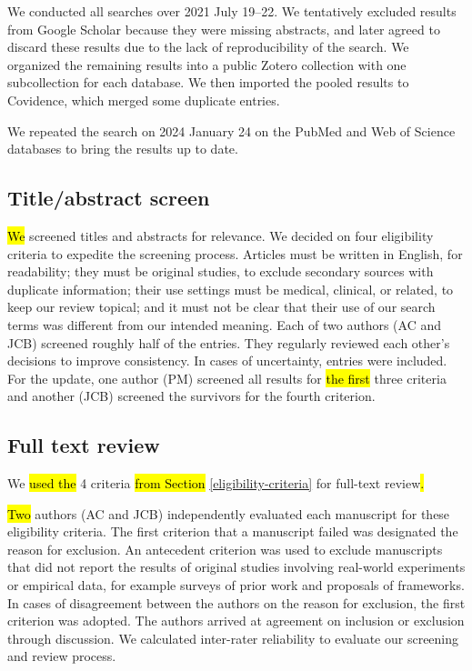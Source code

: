 \documentclass[sn-mathphys,Numbered,pdflatex]{sn-jnl}
\theoremstyle{remark}
\theoremstyle{definition}
\begin{document}
We conducted all searches over 2021 July 19--22. We tentatively excluded
results from Google Scholar because they were missing abstracts, and
later agreed to discard these results due to the lack of reproducibility
of the search. We organized the remaining results into a public Zotero
collection with one subcollection for each database. We then imported
the pooled results to Covidence, which merged some duplicate entries.

We repeated the search on 2024 January 24 on the PubMed and Web of
Science databases to bring the results up to date.

\subsection{Title/abstract screen}\label{titleabstract-screen}

\hl{We} screened titles and abstracts for relevance. We decided on four
eligibility criteria to expedite the screening process. Articles must be
written in English, for readability; they must be original studies, to
exclude secondary sources with duplicate information; their use settings
must be medical, clinical, or related, to keep our review topical; and
it must not be clear that their use of our search terms was different
from our intended meaning. Each of two authors (AC and JCB) screened
roughly half of the entries. They regularly reviewed each other's
decisions to improve consistency. In cases of uncertainty, entries were
included. For the update, one author (PM) screened all results for
\hl{the first }three criteria and another (JCB) screened the survivors
for the fourth criterion.

\subsection{Full text review}\label{full-text-review}

We \hl{used the} 4 criteria\hl{ from Section }\ref{eligibility-criteria}
for full-text review\hl{.}

\hl{Two} authors (AC and JCB) independently evaluated each manuscript
for these eligibility criteria. The first criterion that a manuscript
failed was designated the reason for exclusion. An antecedent criterion
was used to exclude manuscripts that did not report the results of
original studies involving real-world experiments or empirical data, for
example surveys of prior work and proposals of frameworks. In cases of
disagreement between the authors on the reason for exclusion, the first
criterion was adopted. The authors arrived at agreement on inclusion or
exclusion through discussion. We calculated inter-rater reliability to
evaluate our screening and review process.
\end{document}
